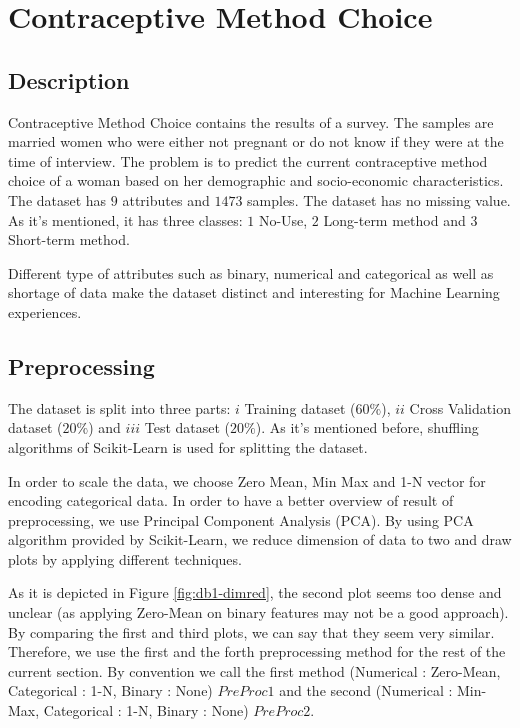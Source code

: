\section{Contraceptive Method Choice}
\label{db:sec:ds1}
\subsection{Description}
Contraceptive Method Choice contains the results of a survey. The samples are married women who were either not pregnant or do not know if they were at the time of interview. The problem is to predict the current contraceptive method choice of a woman based on her demographic and socio-economic characteristics. The dataset has $9$ attributes and $1473$ samples. The dataset has no missing value. As it's mentioned, it has three classes: $1$ No-Use, $2$ Long-term method and $3$ Short-term method.

Different type of attributes such as binary, numerical and categorical as well as shortage of data make the dataset distinct and interesting for Machine Learning experiences.

\subsection{Preprocessing}
The dataset is split into three parts: $i$ Training dataset ($60\%$), $ii$ Cross Validation dataset ($20\%$) and $iii$ Test dataset ($20\%$). As it's mentioned before, shuffling algorithms of Scikit-Learn is used for splitting the dataset.

In order to scale the data, we choose Zero Mean, Min Max and 1-N vector for encoding categorical data. In order to have a better overview of result of preprocessing, we use Principal Component Analysis (PCA). By using PCA algorithm provided by Scikit-Learn, we reduce dimension of data to two and draw plots by applying different techniques. 

As it is depicted in Figure \ref{fig:db1-dimred}, the second plot seems too dense and unclear (as applying Zero-Mean on binary features may not be a good approach). By comparing the first and third plots, we can say that they seem very similar. Therefore, we use the first and the forth preprocessing method for the rest of the current section. By convention we call the first method (Numerical : Zero-Mean, Categorical : 1-N, Binary : None) $PreProc1$ and the second (Numerical : Min-Max, Categorical : 1-N, Binary : None) $PreProc2$.

